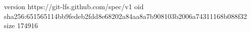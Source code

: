 version https://git-lfs.github.com/spec/v1
oid sha256:651565114bb9fedeb2fdd8e68202a84aa8a7b908103b2006a74311168b088f32
size 174916
